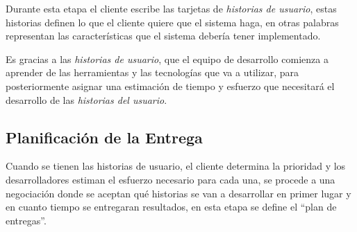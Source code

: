 

           Durante esta etapa el cliente escribe las tarjetas de \emph{historias de usuario}, estas historias definen lo que el cliente quiere que el sistema haga, en otras palabras representan las características que el sistema debería tener implementado.

           Es gracias a las \emph{historias de usuario}, que el equipo de desarrollo comienza a aprender de las herramientas y las tecnologías que va a utilizar, para posteriormente  asignar una estimación de tiempo y esfuerzo que necesitará el desarrollo de las \emph{historias del usuario}.


         \subsection{Planificación de la Entrega}
         \label{sub:planeacion}

       Cuando se tienen las historias de usuario, el cliente determina la prioridad y los desarrolladores estiman el esfuerzo necesario para cada una, se procede a una negociación donde se aceptan qué historias se van a desarrollar en primer lugar y en cuanto tiempo se entregaran resultados, en esta etapa se define el ``plan de entregas''.


